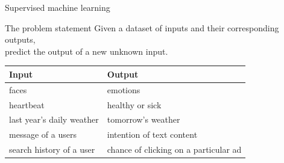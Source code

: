 \documentclass[10pt]{beamer}
\begin{document}
{
\begin{frame}[fragile]{Supervised machine learning}


\begin{exampleblock}{The problem statement}
Given a dataset of inputs and their corresponding outputs,\\ predict the output of a new unknown input.
\end{exampleblock}


\vspace{1cm}
\begin{table}
\begin{tabular}{l  l }
\toprule
Input & Output\\\midrule
faces & emotions\\
heartbeat & healthy or sick\\
last year's daily weather & tomorrow's weather\\
message of a users & intention of text content\\
search history of a user & chance of clicking on a particular ad\\
\end{tabular}
\end{table}




\end{frame}}
\end{document}
